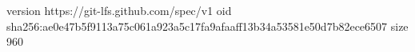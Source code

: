 version https://git-lfs.github.com/spec/v1
oid sha256:ae0e47b5f9113a75c061a923a5c17fa9afaaff13b34a53581e50d7b82ece6507
size 960
